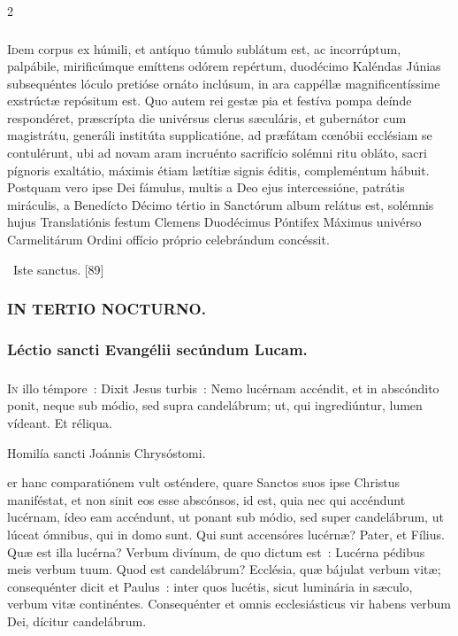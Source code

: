 \documentclass[9pt,twoside]{extarticle}
\begin{document}
\begin{multicols}{2}
{\subsubsection*{\center {}}
\lettrine{I}dem corpus ex húmili, et antíquo túmulo sublátum est, ac incorrúptum, palpábile, mirificúmque emíttens odórem repértum, duodécimo Kaléndas Júnias subsequéntes lóculo pretióse ornáto inclúsum, in ara cappéllæ magnificentíssime exstrúctæ repósitum est. Quo autem rei gestæ pia et festíva pompa deínde respondéret, præscrípta die univérsus clerus sæculáris, et gubernátor cum magistrátu, generáli institúta supplicatióne, ad præfátam cœnóbii ecclésiam se contulérunt, ubi ad novam aram incruénto sacrifício solémni ritu obláto, sacri pígnoris exaltátio, máximis étiam lætítiæ signis éditis, compleméntum hábuit. Postquam vero ipse Dei fámulus, multis a Deo ejus intercessióne, patrátis miráculis, a Benedícto Décimo tértio in Sanctórum album relátus est, solémnis hujus Translatiónis festum Clemens Duodécimus Póntifex Máximus univérso Carmelitárum Ordini offício próprio celebrándum concéssit.

\begin{tightlist}{}
\item {}~Iste sanctus. [89]
\end{tightlist}

\subsubsection*{\center \textsc{IN TERTIO NOCTURNO.}}
\subsubsection*{\center Léctio sancti Evangélii secúndum Lucam.}
\subsubsection*{\center {}}
\lettrine{I}n illo témpore~: Dixit Jesus turbis~: Nemo lucérnam accéndit, et in abscóndito ponit, neque sub módio, sed supra candelábrum; ut, qui ingrediúntur, lumen vídeant. Et réliqua.

\begin{center}Homilía sancti Joánnis Chrysóstomi.\\
\end{center}
er hanc comparatiónem vult osténdere, quare Sanctos suos ipse Christus maniféstat, et non sinit eos esse abscónsos, id est, quia nec qui accéndunt lucérnam, ídeo eam accéndunt, ut ponant sub módio, sed super candelábrum, ut lúceat ómnibus, qui in domo sunt. Qui sunt accensóres lucérnæ? Pater, et Fílius. Quæ est illa lucérna? Verbum divínum, de quo dictum est~: Lucérna pédibus meis verbum tuum. Quod est candelábrum? Ecclésia, quæ bájulat verbum vitæ; consequénter dicit et Paulus~: inter quos lucétis, sicut luminária in sæculo, verbum vitæ continéntes. Consequénter et omnis ecclesiásticus vir habens verbum Dei, dícitur candelábrum.

}
\end{multicols}
\end{document}
